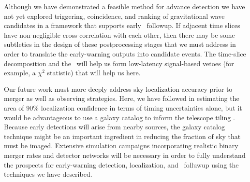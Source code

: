 \begin{comment}
In the future, this
could be improved upon further by conditionally reconstructing the \SNR{} time-series
only during times when a composite detection statistic crosses a
threshold~\citep{svd-compdetstat}.
\end{comment}

Although we have demonstrated a feasible method for advance detection we have
not yet explored triggering, coincidence, and ranking of gravitational wave
candidates in a framework that supports early \EM\ followup.  If adjacent time slices
have non-negligible cross-correlation with each other, then there may be some
subtleties in the design of these postprocessing stages that we must address in order
to translate the early-warning outputs into candidate events.  The time-slice
decomposition and the \SVD\ will help us form low-latency signal-based vetoes
(for example, a $\chi^2$ statistic) that will help us here.

Our future work must more deeply address sky localization accuracy prior to
merger as well as observing strategies. Here, we have followed
\citet{Fairhurst2009} in estimating the area of 90\% localization confidence in
terms of timing uncertainties alone, but it would be advantageous to use a
galaxy catalog to inform the telescope tiling \citep{galaxy-catalog}. Because
early detections will arise from nearby sources, the galaxy catalog technique
might be an important ingredient in reducing the fraction of sky that must be
imaged.  Extensive simulation campaigns incorporating realistic binary merger
rates and detector networks will be necessary in order to fully understand the
prospects for early-warning detection, localization, and \EM\ folluwup using
the techniques we have described.



